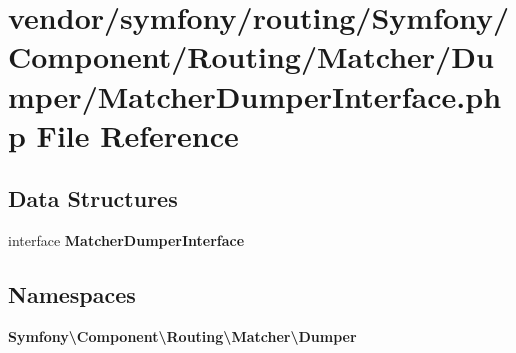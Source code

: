 \section{vendor/symfony/routing/\+Symfony/\+Component/\+Routing/\+Matcher/\+Dumper/\+Matcher\+Dumper\+Interface.php File Reference}
\label{_matcher_dumper_interface_8php}
\subsection*{Data Structures}
\begin{DoxyCompactItemize}
\item 
interface {\bf Matcher\+Dumper\+Interface}
\end{DoxyCompactItemize}
\subsection*{Namespaces}
\begin{DoxyCompactItemize}
\item 
 {\bf Symfony\textbackslash{}\+Component\textbackslash{}\+Routing\textbackslash{}\+Matcher\textbackslash{}\+Dumper}
\end{DoxyCompactItemize}
